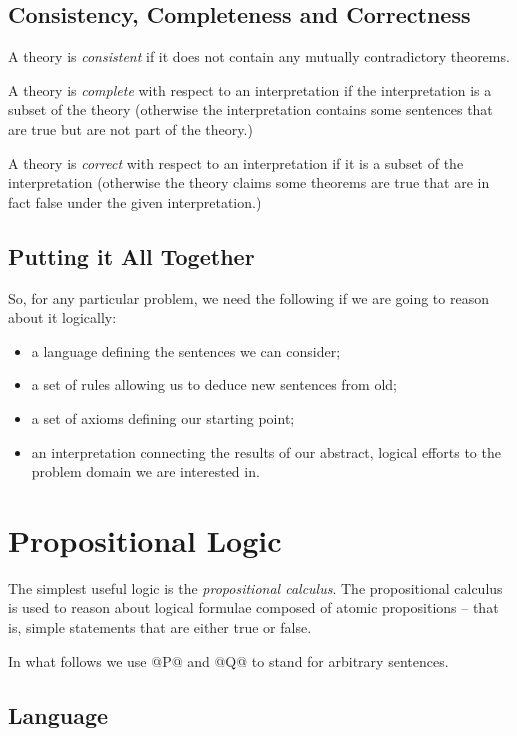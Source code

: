 \subsection{Consistency, Completeness and Correctness}

A theory is \emph{consistent} if it does not contain any mutually
contradictory theorems.

A theory is \emph{complete} with respect to an interpretation if the
interpretation is a subset of the theory (otherwise the interpretation
contains some sentences that are true but are not part of the theory.)

A theory is \emph{correct} with respect to an interpretation if it is a
subset of the interpretation (otherwise the theory claims some theorems
are true that are in fact false under the given interpretation.)

\subsection{Putting it All Together}

So, for any particular problem, we need the following if we are going to
reason about it logically:
\begin{itemize}
\item a language defining the sentences we can consider;
\item a set of rules allowing us to deduce new sentences from old;
\item a set of axioms defining our starting point;
\item an interpretation connecting the results of our abstract, logical
efforts to the problem domain we are interested in.
\end{itemize}

\section{Propositional Logic}

The simplest useful logic is the \emph{propositional calculus}.
The propositional calculus is used to reason about logical formulae
composed of atomic propositions -- that is, simple statements that are
either true or false.

In what follows we use @P@ and @Q@ to stand for arbitrary sentences.

\subsection{Language}

